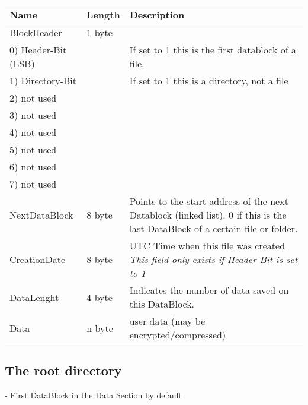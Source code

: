 \begin{tabular}{|l|l|p{5cm}|}
\hline
  \textbf{Name} & \textbf{Length} & \textbf{Description}
\\  \hline
 BlockHeader & 1 byte & 
 \\
 \hspace{0.2cm} 0) Header-Bit (LSB) & &  If set to 1 this is the first datablock
 of a file.
 \\ 
 \hspace{0.2cm} 1) Directory-Bit & &  If set to 1 this is a directory, not a file
 \\ 
 \hspace{0.2cm} 2) not used & &  
 \\ 
 \hspace{0.2cm} 3) not used & &  
 \\ 
 \hspace{0.2cm} 4) not used & &  
 \\ 
 \hspace{0.2cm} 5) not used & &  
 \\ 
 \hspace{0.2cm} 6) not used & &  
 \\ 
 \hspace{0.2cm} 7) not used & &  
 
\\  \hline
 NextDataBlock & 8 byte & 
 Points to the start address of the next Datablock (linked list).
    0 if this is the last DataBlock of a certain file or folder.
\\  \hline
  CreationDate & 8 byte & UTC Time when this file was created
  \newline \textit{This field only exists if Header-Bit is set to 1}
\\  \hline

  DataLenght & 4 byte &
    Indicates the number of data saved on this DataBlock.
    
\\  \hline
 Data & n byte & user data (may be encrypted/compressed)
\\  \hline
\end{tabular}


\subsection{The root directory}

- First DataBlock in the Data Section by default